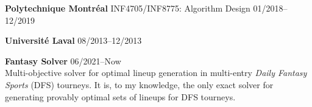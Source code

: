 \documentclass{memoir}
\begin{document}
\begin{list}{}


  \Item \textbf{Polytechnique Montréal}
  \BulletItem INF4705/INF8775: Algorithm Design \hfill 01/2018--12/2019

  \Item \textbf{Université Laval} \hfill 08/2013--12/2013



  \Item \textbf{Fantasy Solver} \hfill 06/2021--Now \\
  Multi-objective solver for optimal lineup generation in multi-entry \emph{Daily Fantasy Sports} (DFS) tourneys. It is, to my knowledge, the only exact solver for generating provably optimal sets of lineups for DFS tourneys.
  
\end{list}
\par
\end{document}
